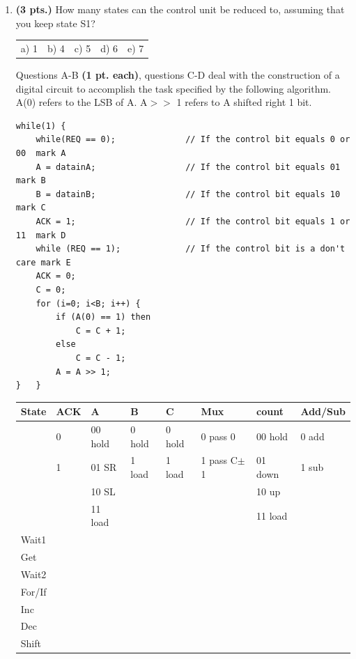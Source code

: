\documentclass{article}
\begin{document}
\begin{enumerate}
\item {\bf (3 pts.)} How many states can the control unit be
reduced to, assuming that you keep state S1?

\begin{tabular}{p{0.75in}p{0.75in}p{0.75in}p{0.75in}p{0.75in}}
a) 1 & b) 4 & c) 5 & d) 6 & e) 7 \\
\end{tabular}

\pagebreak
Questions A-B {\bf (1 pt. each)}, questions C-D deal with the construction 
of a digital circuit to accomplish the task specified by the following 
algorithm.  A(0) refers to the LSB of A.  A$>>$ 1 refers to A shifted right 
1 bit.

{\small
\begin{verbatim}
while(1) {
    while(REQ == 0);              // If the control bit equals 0 or 00  mark A 
    A = datainA;                  // If the control bit equals 01       mark B 
    B = datainB;                  // If the control bit equals 10       mark C 
    ACK = 1;                      // If the control bit equals 1 or 11  mark D 
    while (REQ == 1);             // If the control bit is a don't care mark E 
    ACK = 0;
    C = 0;
    for (i=0; i<B; i++) {
        if (A(0) == 1) then
            C = C + 1;
        else 
            C = C - 1;
        A = A >> 1;
}   } 
\end{verbatim}}
\begin{figure}[ht]
\centerline{}
\end{figure}

\begin{tabular}{|l||l|l|l|l|l|l|l|}  \hline
State & ACK & A       & B      & C      & Mux        & count   & Add/Sub \\ \hline
      & 0   & 00 hold & 0 hold & 0 hold & 0 pass 0   & 00 hold & 0 add \\ \hline
      & 1   & 01 SR   & 1 load & 1 load & 1 pass C$\pm$1 & 01 down & 1 sub \\ \hline
      &     & 10 SL   &        &        &            & 10 up   &       \\ \hline
      &     & 11 load &        &        &            & 11 load &       \\ \hline   \hline
Wait1 & \x  &         &        &        &            &         &       \\ \hline
Get   & \x  &  \x     &  \x    &  \x    &  \x        &  \x     & \x    \\ \hline
Wait2 & \x  &  \x     &        &        &  \x        &  \x     &       \\ \hline
For/If &    &         &        &        &            &         &       \\ \hline
Inc   &     &  \x     &        &  \x    &  \x        &         & \x    \\ \hline
Dec   & \x  &         &        &  \x    &  \x        &         & \x    \\ \hline
Shift &     &  \x     &  \x    &  \x    &  \x        &         & \x    \\ \hline
\end{tabular}


\end{enumerate}
\end{document}
